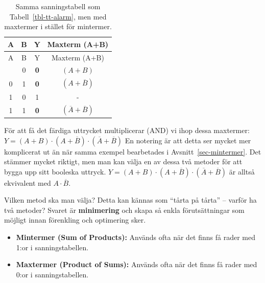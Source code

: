 \documentclass[
  swedish,
  letterpaper,
  oneside,
  openany]{book}
\providecommand{\tightlist}{%
  \setlength{\itemsep}{0pt}\setlength{\parskip}{0pt}}
\begin{document}
\begin{tcolorbox}[enhanced jigsaw, arc=.35mm, bottomrule=.15mm, bottomtitle=1mm, breakable, colback=white, colbacktitle=quarto-callout-note-color!10!white, colframe=quarto-callout-note-color-frame, coltitle=black, left=2mm, leftrule=.75mm, opacityback=0, opacitybacktitle=0.6, rightrule=.15mm, title=\textcolor{quarto-callout-note-color}{\faInfo}\hspace{0.5em}{Exempel: Maxtermer för larmkretsen}, titlerule=0mm, toprule=.15mm, toptitle=1mm]

\begin{longtable}[]{@{}cccc@{}}
\caption{Samma sanningstabell som Tabell~\ref{tbl-tt-alarm}, men med
maxtermer i stället för
mintermer.}\label{tbl-tt-alarm-maxterms}\tabularnewline
\toprule\noalign{}
A & B & Y & Maxterm (A+B) \\
\midrule\noalign{}
\endfirsthead
\toprule\noalign{}
A & B & Y & Maxterm (A+B) \\
\midrule\noalign{}
\endhead
\bottomrule\noalign{}
\endlastfoot
0 & 0 & \textbf{0} & \((A + B)\) \\
0 & 1 & \textbf{0} & \((A + \overline{B})\) \\
1 & 0 & 1 & - \\
1 & 1 & \textbf{0} & \((\overline{A} + \overline{B})\) \\
\end{longtable}

För att få det färdiga uttrycket multiplicerar (AND) vi ihop dessa
maxtermer:
\(Y = (A + B) \cdot (A + \overline{B}) \cdot (\overline{A} + \overline{B})\)
En notering är att detta ser mycket mer komplicerat ut än när samma
exempel bearbetades i Avsnitt~\ref{sec-mintermer}. Det stämmer mycket
riktigt, men man kan välja en av dessa två metoder för att bygga upp
sitt booleska uttryck.
\(Y = (A + B) \cdot (A + \overline{B}) \cdot (\overline{A} + \overline{B})\)
är alltså ekvivalent med \(A \cdot \overline{B}\).

\end{tcolorbox}

Vilken metod ska man välja? Detta kan kännas som ``tårta på tårta'' --
varför ha två metoder? Svaret är \textbf{minimering} och skapa så enkla
förutsättningar som möjligt innan förenkling och optimering sker.

\begin{itemize}
\tightlist
\item
  \textbf{Mintermer (Sum of Products):} Används ofta när det finns få
  rader med 1:or i sanningstabellen.
\item
  \textbf{Maxtermer (Product of Sums):} Används ofta när det finns få
  rader med 0:or i sanningstabellen.
\end{itemize}
\end{document}
